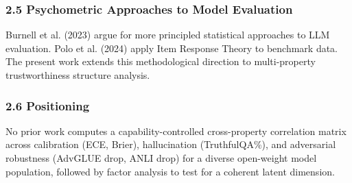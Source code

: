 \subsubsection{2.5 Psychometric Approaches to Model Evaluation}

Burnell et al. (2023) argue for more principled statistical approaches to LLM evaluation. Polo et al. (2024) apply Item Response Theory to benchmark data. The present work extends this methodological direction to multi-property trustworthiness structure analysis.

\subsubsection{2.6 Positioning}

No prior work computes a capability-controlled cross-property correlation matrix across calibration (ECE, Brier), hallucination (TruthfulQA\%), and adversarial robustness (AdvGLUE drop, ANLI drop) for a diverse open-weight model population, followed by factor analysis to test for a coherent latent dimension.

